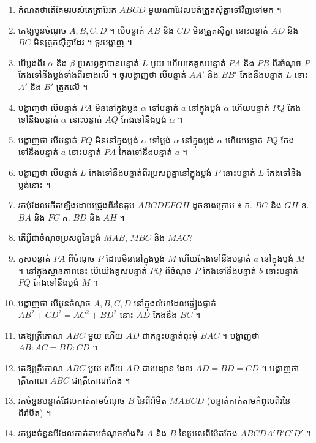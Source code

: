 \begin{enumerate}[1]
\begin{tasks}
    \task $l \perp \alpha$, $m \parallel \alpha \Rightarrow l \perp m$
    \task $\alpha \perp \gamma$, $\beta \perp \gamma \Rightarrow \alpha \parallel \beta$
    \task $\alpha \parallel \beta$, $\beta \parallel \gamma \Rightarrow \alpha \parallel \gamma$
  \end{tasks}
  \item កំណត់ថាតើគែមរបស់តេត្រាអែត $ABCD$ មួយណាដែលបត់ត្រួតស៊ីគ្នាទៅវិញទៅមក ។
  \item គេឱ្យបួនចំណុច $A, B, C, D$ ។ បើបន្ទាត់ $AB$ និង $CD$ មិនត្រួតស៊ីគ្នា នោះបន្ទាត់ $AD$ និង $BC$ មិនត្រួតស៊ីគ្នាដែរ ។ ចូរបង្ហាញ ។
  \item បើប្លង់ពីរ $\alpha$ និង $\beta$ ប្រសព្វគ្នាបានបន្ទាត់ $L$ មួយ ហើយគេគូសបន្ទាត់ $PA$ និង $PB$ ពីរចំណុច $P$ កែងទៅនឹងប្លង់ទាំងពីរខាងលើ ។ ចូរបង្ហាញថា បើបន្ទាត់ $AA'$ និង $BB'$ កែងនឹងបន្ទាត់ $L$ នោះ $A'$ និង $B'$ ត្រួតលើ ។
  \item បង្ហាញថា បើបន្ទាត់ $PA$ មិននៅក្នុងប្លង់ $\alpha$ ទៅបន្ទាត់ $a$ នៅក្នុងប្លង់ $\alpha$ ហើយបន្ទាត់ $PQ$ កែងទៅនឹងបន្ទាត់ $\alpha$ នោះបន្ទាត់ $AQ$ កែងទៅនឹងប្លង់ $\alpha$ ។
  \item បង្ហាញថា បើបន្ទាត់ $PQ$ មិននៅក្នុងប្លង់ $\alpha$ ទៅប្លង់ $\alpha$ នៅក្នុងប្លង់ $\alpha$ ហើយបន្ទាត់ $PQ$ កែងទៅនឹងបន្ទាត់ $a$ នោះបន្ទាត់ $PA$ កែងទៅនឹងបន្ទាត់ $a$ ។
  \item បង្ហាញថា បើបន្ទាត់ $L$ កែងទៅនឹងបន្ទាត់ពីរប្រសព្វគ្នានៅក្នុងប្លង់ $P$ នោះបន្ទាត់ $L$ កែងទៅនឹងប្លង់នោះ ។
  \item រកមុំដែលកើតឡើងដោយជ្រុងពីរនៃគូប $ABCDEFGH$ ដូចខាងក្រោម ៖ \quad ក. $BC$ និង $GH$ \quad ខ. $BA$ និង $FC$ \quad គ. $BD$ និង $AH$ ។
  \item តើអ្វីជាចំណុចប្រសព្វនៃប្លង់ $MAB$, $MBC$ និង $MAC$?
  \item គូសបន្ទាត់ $PA$ ពីចំណុច $P$ ដែលមិននៅក្នុងប្លង់ $M$ ហើយកែងទៅនឹងបន្ទាត់ $a$ នៅក្នុងប្លង់ $M$ ។ នៅក្នុងស្ថានភាពនេះ បើយើងគូសបន្ទាត់ $PQ$ ពីចំណុច $P$ កែងទៅនឹងបន្ទាត់ $b$ នោះបន្ទាត់ $PQ$ កែងទៅនឹងប្លង់ $M$ ។
  \item បង្ហាញថា បើបួនចំណុច $A, B, C, D$ នៅក្នុងលំហដែលផ្ទៀងផ្ទាត់ $AB^2 + CD^2 = AC^2 + BD^2$ នោះ $AD$ កែងនឹង $BC$ ។
  \item គេឱ្យត្រីកោណ $ABC$ មួយ ហើយ $AD$ ជាកន្លះបន្ទាត់ពុះមុំ $BAC$ ។ បង្ហាញថា $AB : AC = BD : CD$ ។
  \item គេឱ្យត្រីកោណ $ABC$ មួយ ហើយ $AD$ ជាមេដ្យាន ដែល $AD = BD = CD$ ។ បង្ហាញថាត្រីកោណ $ABC$ ជាត្រីកោណកែង ។
  \item រកចំនួនបន្ទាត់ដែលកាត់តាមចំណុច $B$ នៃពីរ៉ាមីត $MABCD$ (បន្ទាត់កាត់តាមកំពូលពីរនៃពីរ៉ាមីត) ។
  \item រកប្លង់ចំនួនបីដែលកាត់តាមចំណុចទាំងពីរ $A$ និង $B$ នៃប្រលេពីប៉ែតកែង $ABCDA'B'C'D'$ ។

\end{enumerate}
